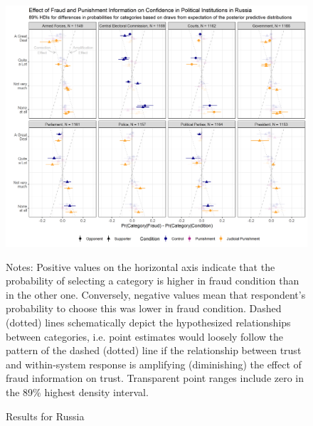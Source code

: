 \documentclass[11pt, ngerman,english,a4]{article}
\begin{document}
\begin{figure}
    \centering
    \includegraphics[width=\linewidth,trim=4 4 4 4,clip]{figs/ru_hdi89_conditional.png}
    \caption{Results for Russia}
    \singlespacing
    \raggedright
    \footnotesize{Notes: Positive values on the horizontal axis indicate that the probability of selecting a category is higher in fraud condition than in the other one. Conversely, negative values mean that respondent's probability to choose this was lower in fraud condition. Dashed (dotted) lines schematically depict the hypothesized relationships between categories, i.e. point estimates would loosely follow the pattern of the dashed (dotted) line if the relationship between trust and within-system response is amplifying (diminishing) the effect of fraud information on trust. Transparent point ranges include zero in the 89\% highest density interval.} 
    \label{fig:het-ru}
    \end{figure}
\end{document}
